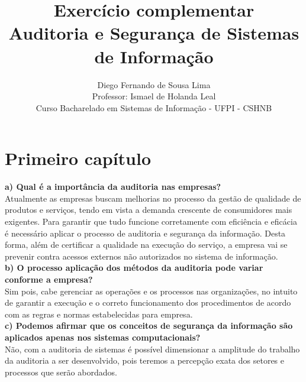 \documentclass[12pt]{article}
\begin{document}
 
 
 
\title{Exercício complementar\\Auditoria e Segurança de Sistemas de Informação}%
\author{Diego Fernando de Sousa Lima\\Professor: Ismael de Holanda Leal\\ %
Curso Bacharelado em Sistemas de Informação - UFPI - CSHNB} %
 
\maketitle
 
\section{Primeiro capítulo}

\textbf{a) Qual é a importância da auditoria nas empresas?}
\\
Atualmente as empresas buscam melhorias no processo da gestão de qualidade de produtos e serviços, tendo em vista a demanda crescente de consumidores mais exigentes. Para garantir que tudo funcione corretamente com eficiência e eficácia é necessário aplicar o processo de auditoria e segurança da informação. Desta forma, além de certificar a qualidade na execução do serviço, a empresa vai se prevenir contra acessos externos não autorizados no sistema de informação.
\\

\textbf{b) O processo aplicação dos métodos da auditoria pode variar conforme a empresa?}
\\
Sim pois, cabe gerenciar as operações e os processos nas organizações, no intuito de garantir a execução e o correto funcionamento dos procedimentos de acordo com as regras e normas estabelecidas para empresa.
\\

\textbf{c) Podemos afirmar que os conceitos de segurança da informação são aplicados apenas nos sistemas computacionais?}
\\
Não, com a auditoria de sistemas é possível dimensionar a amplitude do trabalho da auditoria a ser desenvolvido, pois teremos a percepção exata dos setores e processos que serão abordados. 
\\
\end{document}
